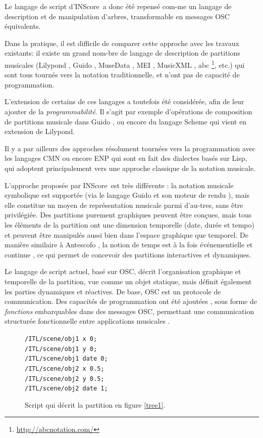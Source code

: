 \documentclass{article}
\newcommand{\IS}		{INScore}
\newcommand{\code}	[2][0.9]		{\vspace{0mm}\begin{center}\colorbox{mygrey}{
							\begin{minipage}[t]{#1\columnwidth} 
							{\small \texttt{#2}}
							\end{minipage}}\end{center}}
\begin{document}
Le langage de script d'\IS\ a donc été repensé com-me un langage de description et de manipulation d'arbres, transformable en messages OSC équivalents.

Dans la pratique, il est difficile de comparer cette approche avec les travaux existants: il existe un grand nom-bre de langage de description de partitions musicales (Lilypond \cite{lilypond03}, Guido \cite{hoos98}, MuseData \cite{Hewlett97}, MEI \cite{Roland_2002}, MusicXML \cite{good01}, abc \footnote{\url{http://abcnotation.com/}}, etc.) qui sont tous tournés vers la notation traditionnelle, et n'ont pas de capacité de programmation. 

L'extension de certains de ces langages a toutefois été considérée, afin de leur ajouter de la \textit{programmabilité}. Il s'agit par exemple d'opérations de composition de partitions musicale dans Guido \cite{fober12b}, ou encore du langage Scheme qui vient en extension de Lilypond.

Il y a par ailleurs des approches résolument tournées vers la programmation avec les langages CMN \cite{Schottstaedt97} ou encore ENP 
\cite{KUUSK06} qui sont en fait des dialectes basés sur Lisp, qui adoptent principalement vers une approche classique de la notation musicale.

L'approche proposée par \IS\ est très différente : la notation musicale symbolique est supportée (via le langage Guido et son moteur de rendu \cite{Dau:09b,hoos98}), mais elle constitue un moyen de représentation musicale parmi d'au-tres, sans être privilégiée. 
Des partitions purement graphiques peuvent être conçues, mais tous les éléments de la partition ont une dimension temporelle (date, durée et tempo) et peuvent être manipulés aussi bien dans l'espace graphique que temporel. De manière similaire à Antescofo \cite{acont08}, la notion de temps est à la fois événementielle et continue \cite{fober17c}, ce qui permet de concevoir des partitions interactives et dynamiques.

Le langage de script actuel, basé sur OSC, décrit l'organisation graphique et temporelle de la partition, vue comme un objet statique, mais définit également les parties dynamiques et réactives.
De base, OSC est un protocole de communication. Des capacités de programmation ont été ajoutées \cite{429}, sous forme de \emph{fonctions} embarquables dans des messages OSC, permettant une communication structurée fonctionnelle entre applications musicales \cite{bresson:hal-01353794}. 

\begin{figure}[htbp]
\code{/ITL/scene/obj1 x 0;\\
/ITL/scene/obj1 y    0;\\
/ITL/scene/obj1 date 0;\\
/ITL/scene/obj2 x    0.5;\\
/ITL/scene/obj2 y    0.5;\\
/ITL/scene/obj2 date 1;
}
\caption{Script qui décrit la partition en figure \ref{tree1}.}
\label{script1}
\end{figure}
\end{document}
